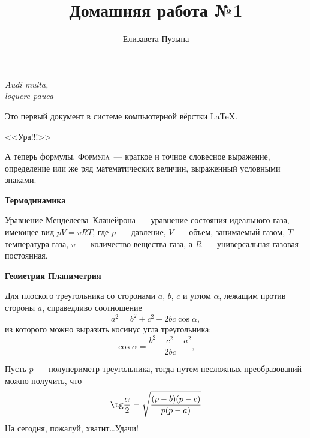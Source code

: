 \documentclass[12pt]{article}
\title{Домашняя работа №1}
\author{Елизавета Пузына}
\date{}
\begin{document}
	\maketitle
	\begin{flushright}
	\textit{Audi multa,\\ loquere pauca}
	\end{flushright}

	\vspace{20pt}Это первый документ в системе компьютерной вёрстки \LaTeX.
	
	\begin{center}
	\huge \textsf{<<Ура!!!>>}
	\end{center}
	
	А теперь формулы. \textsc{Формула}~--- краткое и точное словесное выражение, определение или же ряд математических величин, выраженный условными знаками.
	
    \vspace{15pt} \hspace{14pt} {\bfseries \Large Термодинамика}
	
	Уравнение Менделеева--Кланейрона~--- уравнение состояния идеального газа, имеющее вид $pV = vRT$, где $p$~--- давление, $V$~--- объем, занимаемый газом, $T$~--- температура газа, $v$~--- количество вещества газа, а $R$~--- универсальная газовая постоянная.
	
	{\vspace{15pt} \hspace{14pt} \bfseries \Large Геометрия \hfill Планиметрия}
	
    Для плоского треугольника со сторонами $a$, $b$, $c$ и углом $\alpha$, лежащим против стороны $a$, справедливо соотношение
	$$
	a^2 = b^2 + c^2 - 2bc \cos \alpha,
	$$
	из которого можно выразить косинус угла треугольника:
	$$
	\cos \alpha = \frac{b^2 + c^2 - a^2}{2bc},
	$$
	
	Пусть $p$~--- полупериметр треугольника, тогда путем несложных преобразований можно получить, что
	$$
	\tg \frac{\alpha}{2} = \sqrt{\frac{(p-b)(p-c)}{p(p-a)}}
	$$
	\vspace{1cm} \hspace{-7pt} На сегодня, пожалуй, хватит\dots Удачи!
\end{document}
